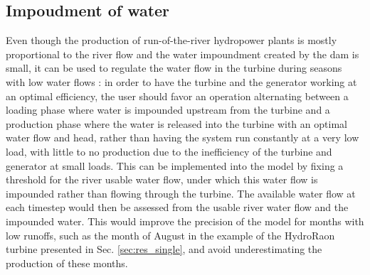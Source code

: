 \subsection{Impoudment of water}

Even though the production of run-of-the-river hydropower plants is mostly proportional to the river flow and the water impoundment created by the dam is small, it can be used to regulate the water flow in the turbine during seasons with low water flows : in order to have the turbine and the generator working at an optimal efficiency, the user should favor an operation alternating between a loading phase where water is impounded upstream from the turbine and a production phase where the water is released into the turbine with an optimal water flow and head, rather than having the system run constantly at a very low load, with little to no production due to the inefficiency of the turbine and generator at small loads. \newline
This can be implemented into the model by fixing a threshold for the river usable water flow, under which this water flow is impounded rather than flowing through the turbine. The available water flow at each timestep would then be assessed from the usable river water flow and the impounded water. This would improve the precision of the model for months with low runoffs, such as the month of August in the example of the HydroRaon turbine presented in Sec. \ref{sec:res_single}, and avoid underestimating the production of these months.

